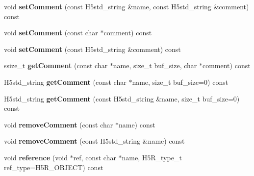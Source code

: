 \begin{DoxyCompactItemize}
\item 
\mbox{\label{class_h5_1_1_h5_location_a2b886d9b49814c1cb09b884c0b87fc7b}} 
void {\bfseries set\+Comment} (const H5std\+\_\+string \&name, const H5std\+\_\+string \&comment) const
\item 
\mbox{\label{class_h5_1_1_h5_location_a209188b072357682772182027904504a}} 
void {\bfseries set\+Comment} (const char $\ast$comment) const
\item 
\mbox{\label{class_h5_1_1_h5_location_aead4e9a2dae70855b46b3f2720db0040}} 
void {\bfseries set\+Comment} (const H5std\+\_\+string \&comment) const
\item 
\mbox{\label{class_h5_1_1_h5_location_a55e9f22742e9fbacf97059c68c7a638c}} 
ssize\+\_\+t {\bfseries get\+Comment} (const char $\ast$name, size\+\_\+t buf\+\_\+size, char $\ast$comment) const
\item 
\mbox{\label{class_h5_1_1_h5_location_a60519208cec35cb3b5714c4ab4c42b78}} 
H5std\+\_\+string {\bfseries get\+Comment} (const char $\ast$name, size\+\_\+t buf\+\_\+size=0) const
\item 
\mbox{\label{class_h5_1_1_h5_location_a19123efc0dbd20e1ffa7eeaef4dba284}} 
H5std\+\_\+string {\bfseries get\+Comment} (const H5std\+\_\+string \&name, size\+\_\+t buf\+\_\+size=0) const
\item 
\mbox{\label{class_h5_1_1_h5_location_a196e3fe0976e1d5485be73a1134cec0a}} 
void {\bfseries remove\+Comment} (const char $\ast$name) const
\item 
\mbox{\label{class_h5_1_1_h5_location_a2b7b66cc4365acbd187c6e198ab8d6fe}} 
void {\bfseries remove\+Comment} (const H5std\+\_\+string \&name) const
\item 
\mbox{\label{class_h5_1_1_h5_location_ad5fbc78ec9b124db4f062656aa5b2629}} 
void {\bfseries reference} (void $\ast$ref, const char $\ast$name, H5\+R\+\_\+type\+\_\+t ref\+\_\+type=H5\+R\+\_\+\+O\+B\+J\+E\+CT) const
\item 

\end{DoxyCompactItemize}
